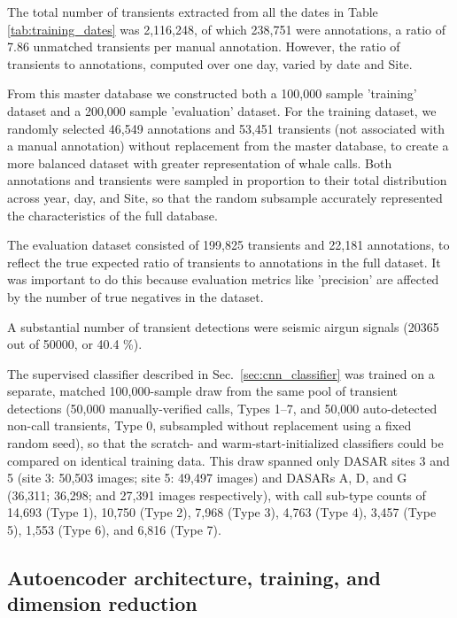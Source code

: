 \documentclass[preprint,NumberedRefs]{JASAnew}
\begin{document}
The total number of transients extracted from all the dates in Table \ref{tab:training_dates} was 2,116,248, of which 238,751 were annotations, a ratio of 7.86 unmatched transients per manual annotation.  However, the ratio of transients to annotations, computed over one day, varied by date and Site.

From this master database we constructed both a 100,000 sample 'training' dataset and a 200,000 sample 'evaluation' dataset.  For the training dataset, we randomly selected 46,549 annotations and 53,451 transients (not associated with a manual annotation) without replacement from the master database, to create a more balanced dataset with greater representation of whale calls.  Both annotations and transients were sampled in proportion to their total distribution across year, day, and Site, so that the random subsample accurately represented the characteristics of the full database.

The evaluation dataset consisted of 199,825 transients and 22,181 annotations, to reflect the true expected ratio of transients to annotations in the full dataset.  It was important to do this because evaluation metrics like 'precision' are affected by the number of true negatives in the dataset.

A substantial number of transient detections were seismic airgun signals (20365 out of 50000, or 40.4 \%).

The supervised classifier described in Sec.~\ref{sec:cnn_classifier} was trained on a
separate, matched 100,000-sample draw from the same pool of transient detections (50,000
manually-verified calls, Types 1--7, and 50,000 auto-detected non-call transients, Type 0,
subsampled without replacement using a fixed random seed), so that the scratch- and
warm-start-initialized classifiers could be compared on identical training data. This
draw spanned only DASAR sites 3 and 5 (site 3: 50,503 images; site 5: 49,497 images) and
DASARs A, D, and G (36,311; 36,298; and 27,391 images respectively), with call sub-type
counts of 14,693 (Type 1), 10,750 (Type 2), 7,968 (Type 3), 4,763 (Type 4), 3,457 (Type
5), 1,553 (Type 6), and 6,816 (Type 7).


 

\subsection{\label{sec:autoencoder}Autoencoder architecture, training, and dimension reduction}

\end{document}
